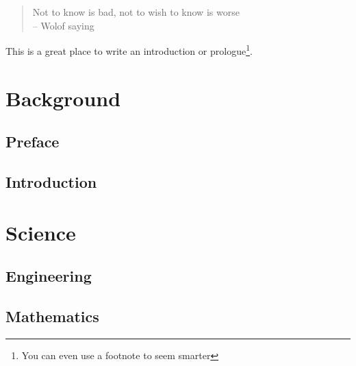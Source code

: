 \documentclass[oneside,11pt]{memoir} %
\begin{document}
\begin{quote}
Not to know is bad, not to wish to know is worse\\
-- Wolof saying
\end{quote}

This is a great place to write an introduction or prologue\footnote{You can even use a footnote to seem smarter}.


\part*{Background}


\chapter{Preface}

\chapter{Introduction}

\part{Science}

\chapter{Engineering}


\chapter{Mathematics}
\end{document}
